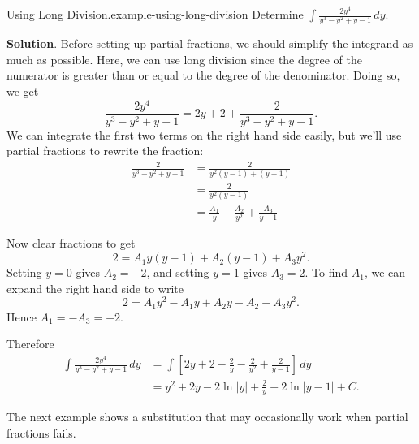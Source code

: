 \documentclass[10pt,]{book}
\numberwithin{equation}{section}
\begin{document}
\begin{example}{Using Long Division.}{example-using-long-division}%
\hypertarget{p-567}{}%
Determine \(\int\frac{2y^{4}}{y^{3} - y^{2} + y - 1}\,dy\).%
\par\smallskip%
\noindent\textbf{Solution}.\hypertarget{solution-124}{}\quad%
\hypertarget{p-568}{}%
Before setting up partial fractions, we should simplify the integrand as much as possible. Here, we can use long division since the degree of the numerator is greater than or equal to the degree of the denominator. Doing so, we get%
\begin{equation*}
\frac{2y^{4}}{y^{3} - y^{2} + y - 1} = 2y + 2 + \frac{2}{y^{3} - y^{2} + y - 1}.
\end{equation*}
We can integrate the first two terms on the right hand side easily, but we'll use partial fractions to rewrite the fraction:%
\begin{align*}
\frac{2}{y^{3} - y^{2} + y - 1} & = \frac{2}{y^{2}(y - 1) + (y - 1)} \\
& = \frac{2}{y^{2}(y - 1)} \\
& = \frac{A_{1}}{y} + \frac{A_{2}}{y^{2}} + \frac{A_{3}}{y - 1} 
\end{align*}
%
\par
\hypertarget{p-569}{}%
Now clear fractions to get%
\begin{equation*}
2 = A_{1}y(y-1) + A_{2}(y-1) + A_{3}y^{2}.
\end{equation*}
Setting \(y = 0\) gives \(A_{2} = -2\), and setting \(y = 1\) gives \(A_{3} = 2\). To find \(A_{1}\), we can expand the right hand side to write%
\begin{equation*}
2 = A_{1}y^{2} - A_{1}y + A_{2}y - A_{2} + A_{3}y^{2}.
\end{equation*}
Hence \(A_{1} = -A_{3} = -2\).%
\par
\hypertarget{p-570}{}%
Therefore%
\begin{align*}
\int\frac{2y^{4}}{y^{3} - y^{2} + y - 1}\,dy & = \int\left[2y + 2 - \frac{2}{y} - \frac{2}{y^{2}} + \frac{2}{y - 1}\right]\,dy  \\
& = y^{2} + 2y - 2\ln|y| + \frac{2}{y} + 2\ln|y-1| + C. 
\end{align*}
%
\end{example}
\hypertarget{p-571}{}%
The next example shows a substitution that may occasionally work when partial fractions fails.%
\end{document}
